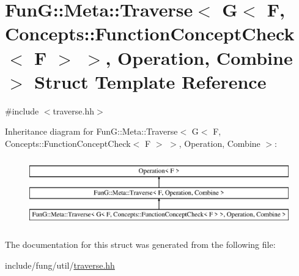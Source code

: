 \hypertarget{structFunG_1_1Meta_1_1Traverse_3_01G_3_01F_00_01Concepts_1_1FunctionConceptCheck_3_01F_01_4_01_473eb79b17eeedd14b27190d68eb8ea5c}{\section{Fun\-G\-:\-:Meta\-:\-:Traverse$<$ G$<$ F, Concepts\-:\-:Function\-Concept\-Check$<$ F $>$ $>$, Operation, Combine $>$ Struct Template Reference}
\label{structFunG_1_1Meta_1_1Traverse_3_01G_3_01F_00_01Concepts_1_1FunctionConceptCheck_3_01F_01_4_01_473eb79b17eeedd14b27190d68eb8ea5c}
}


{\ttfamily \#include $<$traverse.\-hh$>$}

Inheritance diagram for Fun\-G\-:\-:Meta\-:\-:Traverse$<$ G$<$ F, Concepts\-:\-:Function\-Concept\-Check$<$ F $>$ $>$, Operation, Combine $>$\-:\begin{figure}[H]
\begin{center}
\leavevmode
\includegraphics[height=2.989324cm]{structFunG_1_1Meta_1_1Traverse_3_01G_3_01F_00_01Concepts_1_1FunctionConceptCheck_3_01F_01_4_01_473eb79b17eeedd14b27190d68eb8ea5c}
\end{center}
\end{figure}


The documentation for this struct was generated from the following file\-:\begin{DoxyCompactItemize}
\item 
include/fung/util/\hyperlink{traverse_8hh}{traverse.\-hh}\end{DoxyCompactItemize}
